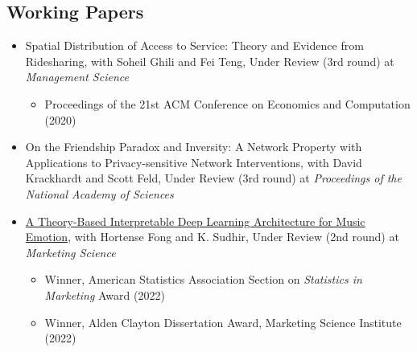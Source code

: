 \documentclass[margin, line, centered, 10pt]{res}
\begin{document}
\begin{resume}

\section{\sc Working Papers} 
\begin{itemize}
\item Spatial Distribution of Access to Service: Theory and Evidence from Ridesharing, with Soheil Ghili and Fei Teng, Under Review (3rd round) at  \textit{Management Science}
\begin{itemize}
\item Proceedings of the 21st ACM Conference on Economics and Computation (2020)
\end{itemize}
\item On the Friendship Paradox and Inversity: A Network Property with Applications to Privacy-sensitive Network Interventions, with David Krackhardt and Scott Feld, Under Review (3rd round) at \textit{Proceedings of the National Academy of Sciences}
\item \href{http://vineetkumars.github.io/Papers/MusicEmotion.pdf}{A Theory-Based Interpretable Deep Learning Architecture for Music Emotion}, with Hortense Fong and K. Sudhir, Under Review (2nd round) at \textit{Marketing Science}
\begin{itemize}
\item Winner, American Statistics Association Section on \textit{Statistics in Marketing} Award (2022)
\item Winner, Alden Clayton Dissertation Award, Marketing Science Institute (2022)
\end{itemize}

\end{itemize}
\end{resume}
\end{document}

